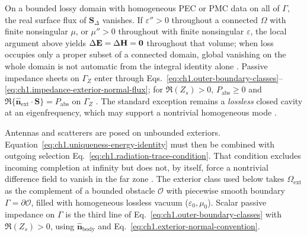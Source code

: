 On a bounded lossy domain with homogeneous PEC or PMC data on all of $\Gamma$, the real surface flux of $\mathbf{S}_\Delta$ vanishes. If $\varepsilon''>0$ throughout a connected $\Omega$ with finite nonsingular $\mu$, or $\mu''>0$ throughout with finite nonsingular $\varepsilon$, the local argument above yields $\Delta\mathbf{E}=\Delta\mathbf{H}=\mathbf{0}$ throughout that volume; when loss occupies only a proper subset of a connected domain, global vanishing on the whole domain is not automatic from the integral identity alone \cite{stratton1941}. Passive impedance sheets on $\Gamma_Z$ enter through Eqs.~\eqref{eq:ch1.outer-boundary-classes}--\eqref{eq:ch1.impedance-exterior-normal-flux}; for $\Re(Z_s)>0$, $P_{\mathrm{abs}}\ge0$ and $\Re\{\hat{\mathbf{n}}_{\mathrm{ext}}\cdot\mathbf{S}\}=P_{\mathrm{abs}}$ on $\Gamma_Z$ \cite{stratton1941,harrington2001}. The standard exception remains a \emph{lossless} closed cavity at an eigenfrequency, which may support a nontrivial homogeneous mode \cite{stratton1941,sommerfeld1949}.

Antennas and scatterers are posed on unbounded exteriors. Equation~\eqref{eq:ch1.uniqueness-energy-identity} must then be combined with outgoing selection Eq.~\eqref{eq:ch1.radiation-trace-condition}. That condition excludes incoming completion at infinity but does not, by itself, force a nontrivial difference field to vanish in the far zone \cite{sommerfeld1949,harrington2001}. The exterior class used below takes $\Omega_{\mathrm{ext}}$ as the complement of a bounded obstacle $\mathcal{O}$ with piecewise smooth boundary $\Gamma=\partial\mathcal{O}$, filled with homogeneous lossless vacuum ($\varepsilon_0,\mu_0$). Scalar passive impedance on $\Gamma$ is the third line of Eq.~\eqref{eq:ch1.outer-boundary-classes} with $\Re(Z_s)>0$, using $\hat{\mathbf{n}}_{\mathrm{body}}$ and Eq.~\eqref{eq:ch1.exterior-normal-convention}.


